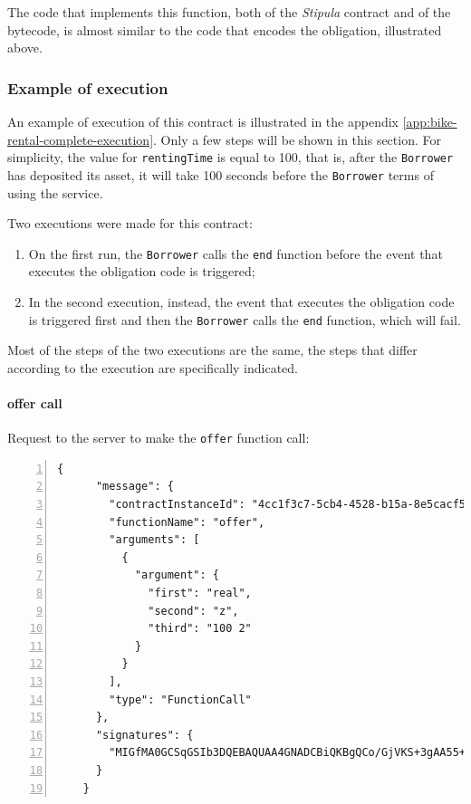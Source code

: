 The code that implements this function, both of the \textit{Stipula} contract and of the bytecode, is 
almost similar to the code that encodes the obligation, illustrated above.

\subsubsection{Example of execution}

An example of execution of this contract is illustrated in the appendix 
\ref{app:bike-rental-complete-execution}. Only a few steps will be shown in this section. For simplicity, 
the value for \verb|rentingTime| is equal to 100, that is, after the \verb|Borrower| has deposited its 
asset, it will take 100 seconds before the \verb|Borrower| terms of using the service.

Two executions were made for this contract:
\begin{enumerate}
  \item On the first run, the \verb|Borrower| calls the \verb|end| function before the event that executes 
  the obligation code is triggered;
  \item In the second execution, instead, the event that executes the obligation code is triggered first 
  and then the \verb|Borrower| calls the \verb|end| function, which will fail.
\end{enumerate}

Most of the steps of the two executions are the same, the steps that differ according to the execution are 
specifically indicated.

\paragraph{offer call}

Request to the server to make the \verb|offer| function call:
{
  \small
  \begin{Verbatim}[numbers=left,xleftmargin=1cm,firstnumber=1,breaklines=true,breakanywhere=true,tabsize=2]
    {
      "message": {
        "contractInstanceId": "4cc1f3c7-5cb4-4528-b15a-8e5cacf5b18a",
        "functionName": "offer",
        "arguments": [
          {
            "argument": {
              "first": "real",
              "second": "z",
              "third": "100 2"
            }
          }
        ],
        "type": "FunctionCall"
      },
      "signatures": {
        "MIGfMA0GCSqGSIb3DQEBAQUAA4GNADCBiQKBgQCo/GjVKS+3gAA55+kko41yINdOcCLQMSBQyuTTkKHE1mhu/TgOpivM0wLPsSga8hQMr3+v3aR0IF/vfCRf6SdiXmWx/jflmEXtnT6fkGcnV6dGNUpHWXSpwUIDt0N88jfnEqekx4S+KDCKg99sGEeHeT65fKS8lB0gjHMt9AOriwIDAQAB": "bJ0xnIhcDlPMmKYx7h8jjX8Q7PaSdqxRg7xq/zTM0vEKqJVDIN0JcT8Qj7jEX5Pwm2YOq+kSwEAxqlPzwoZoQNhe6FPyz6dbj9/LQ0rg79x4QD5ZrCawpcbbtJ/U5l1RPGvl06EdHeQc4YFlsIW4yywD1XlKtfJc7IJwes/iKrE="
      }
    }
  \end{Verbatim}
}

